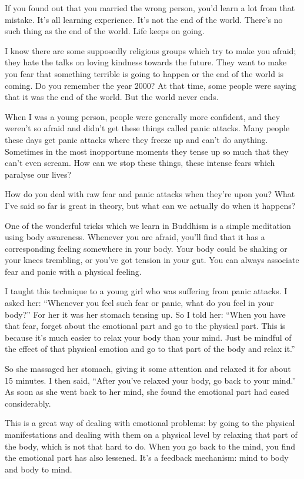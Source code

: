 \documentclass[12pt, openany]{book}
\begin{document}
If you found out that you married the wrong person, you’d learn a lot from that mistake. It’s all learning experience. It’s not the end of the world. There’s no such thing as the end of the world. Life keeps on going. 

I know there are some supposedly religious groups which try to make you afraid; they hate the talks on loving kindness towards the future. They want to make you fear that something terrible is going to happen or the end of the world is coming. Do you remember the year 2000? At that time, some people were saying that it was the end of the world. But the world never ends. 

When I was a young person, people were generally more confident, and they weren’t so afraid and didn’t get these things called panic attacks. Many people these days get panic attacks where they freeze up and can’t do anything. Sometimes in the most inopportune moments they tense up so much that they can’t even scream. How can we stop these things, these intense fears which paralyse our lives? 

How do you deal with raw fear and panic attacks when they’re upon you? What I’ve said so far is great in theory, but what can we actually do when it happens? 

One of the wonderful tricks which we learn in Buddhism is a simple meditation using body awareness. Whenever you are afraid, you’ll find that it has a corresponding feeling somewhere in your body. Your body could be shaking or your knees trembling, or you’ve got tension in your gut. You can always associate fear and panic with a physical feeling. 

I taught this technique to a young girl who was suffering from panic attacks. I asked her: “Whenever you feel such fear or panic, what do you feel in your body?” For her it was her stomach tensing up. So I told her: “When you have that fear, forget about the emotional part and go to the physical part. This is because it’s much easier to relax your body than your mind. Just be mindful of the effect of that physical emotion and go to that part of the body and relax it.” 

So she massaged her stomach, giving it some attention and relaxed it for about 15 minutes. I then said, “After you’ve relaxed your body, go back to your mind.” As soon as she went back to her mind, she found the emotional part had eased considerably. 

This is a great way of dealing with emotional problems: by going to the physical manifestations and dealing with them on a physical level by relaxing that part of the body, which is not that hard to do. When you go back to the mind, you find the emotional part has also lessened. It’s a feedback mechanism: mind to body and body to mind. 
\end{document}
